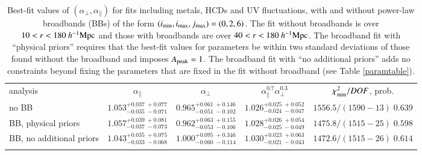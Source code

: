 \documentclass{aa}
\newcommand{\imin}{i_{\rm min}}
\newcommand{\imax}{i_{\rm max}}
\newcommand{\jmax}{j_{\rm max}}
\newcommand{\apar}{\alpha_\parallel}
\newcommand{\aperp}{\alpha_\perp}
\newcommand{\hMpc}{h^{-1}{\rm Mpc}}
\newcommand{\Apeak}{A_{\rm peak}}
\begin{document}
\begin{table*}
\begin{center}
\caption{
  Best-fit values of $(\aperp,\apar)$  for fits including metals, HCDs and UV fluctuations,
  with and without power-law broadbands (BBs) of the form
  $(\imin,\imax,\jmax)=(0,2,6)$.
  The fit without broadbands is over $10<r<180~\hMpc$ and those with broadbands
  are over $40<r<180~\hMpc$.
  The broadband fit with  ``physical priors'' requires that the best-fit values
  for parameters
  be within two standard deviations of those found without the broadband
  and imposes $\Apeak=1$.
  The broadband fit with ``no additional priors'' adds no constraints
  beyond fixing the parameters that are fixed in the fit without broadband
  (see Table \ref{paramtable}).
}
\begin{tabular}{l c c c c }
analysis  
  & $\apar$ 
    & $\aperp$  
    & $\apar^{0.7}\aperp^{0.3}$
    & $\chi^2_{\rm min}/DOF$, prob.  \\
\noalign{\smallskip} 
\hline
\noalign{\smallskip}
\vspace*{3mm}
no BB  & $  1.053  ^{+  0.037 \; +  0.077 }_{- 0.035 \; - 0.071 } $ & $  0.965  ^{+  0.061 \; +  0.146 }_{- 0.051 \; - 0.102 } $ & $  1.026  ^{+ 0.025 \; +  0.052 }_{- 0.024 \; - 0.047 }  $ & $  1556.5 /( 1590 - 13 )\;  0.639 $ \\ %
\vspace*{3mm}
BB, physical priors  & $  1.057  ^{+  0.039 \; +  0.081 }_{- 0.037 \; - 0.073 } $ & $  0.962  ^{+  0.063 \; +  0.155 }_{- 0.053 \; - 0.106 } $ & $  1.028  ^{+ 0.026 \; +  0.054 }_{- 0.025 \; - 0.049 }  $ & $  1475.8 /( 1515 - 25 )\;  0.598 $ \\ %
\vspace*{3mm}
BB, no additional priors  & $  1.043  ^{+  0.035 \; +  0.075 }_{- 0.033 \; - 0.068 } $ & $  1.000  ^{+  0.095 \; +  0.346 }_{- 0.060 \; - 0.114 } $ & $  1.030  ^{+ 0.023 \; +  0.063 }_{- 0.021 \; - 0.043 }  $ & $  1472.6 /( 1515 - 26 )\;  0.614 $ \\ %
\label{fitbroadbandtable}
\end{tabular}
\end{center}
\end{table*}%
\end{document}
